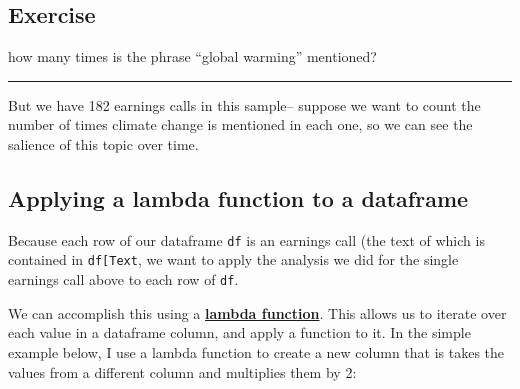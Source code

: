 \documentclass[
  letterpaper,
  DIV=11,
  numbers=noendperiod]{scrreprt}
\begin{document}
\hypertarget{exercise-8}{%
\subsection{Exercise}\label{exercise-8}}

how many times is the phrase ``global warming'' mentioned?

\begin{center}\rule{0.5\linewidth}{0.5pt}\end{center}

But we have 182 earnings calls in this sample-- suppose we want to count
the number of times climate change is mentioned in each one, so we can
see the salience of this topic over time.

\hypertarget{applying-a-lambda-function-to-a-dataframe}{%
\subsection{Applying a lambda function to a
dataframe}\label{applying-a-lambda-function-to-a-dataframe}}

Because each row of our dataframe \texttt{df} is an earnings call (the
text of which is contained in
\texttt{df{[}\textquotesingle{}Text\textquotesingle{}{]}}, we want to
apply the analysis we did for the single earnings call above to each row
of \texttt{df}.

We can accomplish this using a
\href{https://www.w3schools.com/python/python_lambda.asp}{\textbf{lambda
function}}. This allows us to iterate over each value in a dataframe
column, and apply a function to it. In the simple example below, I use a
lambda function to create a new column that is takes the values from a
different column and multiplies them by 2:
\end{document}
